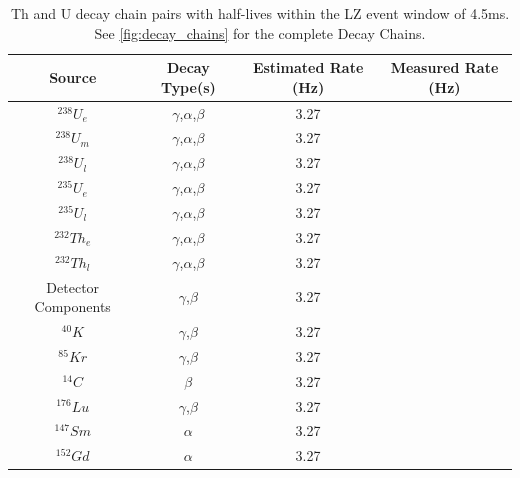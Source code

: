 \begin{table}[!htbp]
    \centering
    \begin{tabular}{c|c|c|c}
        Source              &  Decay Type(s)             & Estimated Rate (Hz)       & Measured Rate (Hz) \\ \hline
        ${}^{238}U_{e}$     & $\gamma$,$\alpha$,$\beta$  & 3.27                      &                     \\ 
        ${}^{238}U_{m}$     & $\gamma$,$\alpha$,$\beta$  & 3.27                      &                     \\
        ${}^{238}U_{l}$     & $\gamma$,$\alpha$,$\beta$  & 3.27                      &                     \\
        ${}^{235}U_{e}$     & $\gamma$,$\alpha$,$\beta$  & 3.27                      &                     \\
        ${}^{235}U_{l}$     & $\gamma$,$\alpha$,$\beta$  & 3.27                      &                     \\
        ${}^{232}Th_{e}$    & $\gamma$,$\alpha$,$\beta$  & 3.27                      &                     \\
        ${}^{232}Th_{l}$    & $\gamma$,$\alpha$,$\beta$  & 3.27                      &                     \\
        Detector Components & $\gamma$,$\beta$           & 3.27                      &                     \\
        ${}^{40}K$          & $\gamma$,$\beta$           & 3.27                      &                     \\
        ${}^{85}Kr$         & $\gamma$,$\beta$           & 3.27                      &                     \\
        ${}^{14}C$          & $\beta$                    & 3.27                      &                     \\
        ${}^{176}Lu$        & $\gamma$,$\beta$           & 3.27                      &                     \\
        ${}^{147}Sm$        & $\alpha$                   & 3.27                      &                     \\
        ${}^{152}Gd$        & $\alpha$                   & 3.27                      &                     
        
        
    \end{tabular}
    \caption{Th and U decay chain pairs with half-lives within the LZ event window of 4.5ms. See \autoref{fig:decay_chains} for the complete Decay Chains.}
    \label{tab:od_constrainable_decays_in_data}
\end{table}